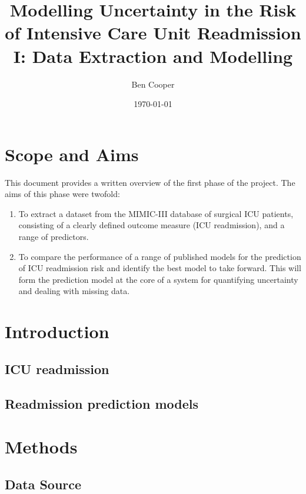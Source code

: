 \documentclass[onecolumn]{article}
\title{Modelling Uncertainty in the Risk of Intensive Care Unit Readmission I: Data Extraction and Modelling}
\date{\today}
\author{Ben Cooper}
\begin{document}
\maketitle

\section{Scope and Aims}

This document provides a written overview of the first phase of the project. The aims of this phase were twofold:

\begin{enumerate}
\item To extract a dataset from the MIMIC-III database of surgical ICU patients, consisting of a clearly defined outcome measure (ICU readmission), and a range of predictors.
\item To compare the performance of a range of published models for the prediction of ICU readmission risk and identify the best model to take forward. This will form the prediction model at the core of a system for quantifying uncertainty and dealing with missing data.
\end{enumerate}

\section{Introduction}

\subsection{ICU readmission}


\subsection{Readmission prediction models}


\section{Methods}


\subsection{Data Source}
\end{document}
